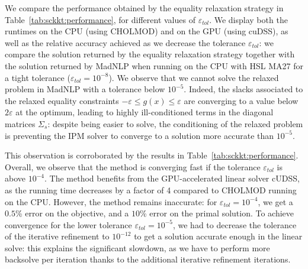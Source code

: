 We compare the performance obtained by the equality relaxation strategy
in Table~\ref{tab:sckkt:performance}, for different values of $\varepsilon_{tol}$.
We display both the runtimes on the CPU (using CHOLMOD) and on the GPU
(using cuDSS), as well as the relative accuracy achieved as we decrease the tolerance
$\varepsilon_{tol}$: we compare the solution
returned by the equality relaxation strategy together
with the solution returned by MadNLP when running on the CPU
with HSL MA27 for a tight tolerance ($\varepsilon_{tol} = 10^{-8}$).
We observe that we cannot solve the relaxed problem in MadNLP
with a tolerance below $10^{-5}$. Indeed, the slacks associated
to the relaxed equality constraints $-\varepsilon \leq g(x) \leq \varepsilon$
are converging to a value below $2 \varepsilon$ at the optimum,
leading to highly ill-conditioned terms in the diagonal matrices
$\Sigma_s$: despite being easier to solve, the conditioning
of the relaxed problem is preventing the IPM solver to converge
to a solution more accurate than $10^{-5}$.

This observation is corroborated by the results in Table~\ref{tab:sckkt:performance}.
Overall, we observe that the method is converging fast
if the tolerance $\varepsilon_{tol}$ is above $10^{-4}$.
The method benefits from the GPU-accelerated linear solver cUDSS, as
the running time decreases by a factor of 4 compared to CHOLMOD
running on the CPU. However, the method remains inaccurate:
for $\varepsilon_{tol} = 10^{-4}$, we get a $0.5$\% error on the objective,
and a $10$\% error on the primal solution.
To achieve convergence for the lower tolerance $\varepsilon_{tol} = 10^{-5}$,
we had to decrease the tolerance of the iterative refinement
to $10^{-12}$ to get a solution accurate enough in the linear solve:
this explains the significant slowdown, as we have to perform more
backsolve per iteration thanks to the additional iterative refinement
iterations.

